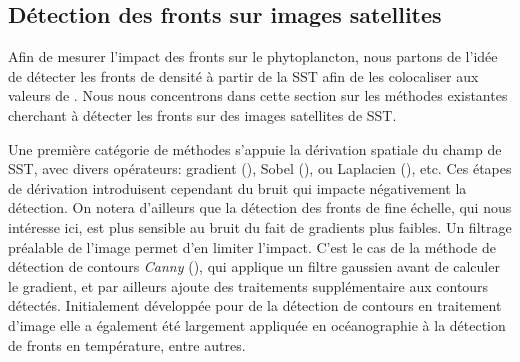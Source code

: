 \begin{figure}
  \centering
\label{fig:sarmiento}
\end{figure}


\subsection{Détection des fronts sur images satellites}
\label{sec:detection-fronts}

Afin de mesurer l'impact des fronts sur le phytoplancton, nous partons de l'idée de détecter les fronts de densité à partir de la SST afin de les colocaliser aux valeurs de .
Nous nous concentrons dans cette section sur les méthodes existantes cherchant à détecter les fronts sur des images satellites de SST.

Une première catégorie de méthodes s'appuie la dérivation spatiale du champ de SST, avec divers opérateurs: gradient (\cite{kazmin_1996, moore_1997, kostianoy_2004}), Sobel (\cite{sauter_1994}), ou Laplacien (\cite{holyer_1989}), etc.
Ces étapes de dérivation introduisent cependant du bruit qui impacte négativement la détection.
On notera d'ailleurs que la détection des fronts de fine échelle, qui nous intéresse ici, est plus sensible au bruit du fait de gradients plus faibles.
Un filtrage préalable de l'image permet d'en limiter l'impact.
C'est le cas de la méthode de détection de contours \emph{Canny} (\cite{canny_1986}), qui applique un filtre gaussien avant de calculer le gradient, et par ailleurs ajoute des traitements supplémentaire aux contours détectés.
Initialement développée pour de la détection de contours en traitement d'image  elle a également été largement appliquée en océanographie à la détection de fronts en température, entre autres.

